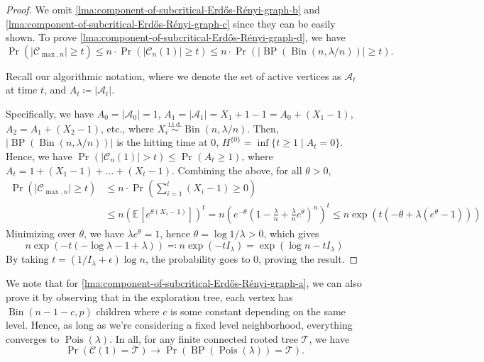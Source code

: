 \begin{proof}
	We omit \autoref{lma:component-of-subcritical-Erdős-Rényi-graph-b} and \autoref{lma:component-of-subcritical-Erdős-Rényi-graph-c} since they can be easily shown. To prove \autoref{lma:component-of-subcritical-Erdős-Rényi-graph-d}, we have
	\[
		\Pr_{}(\lvert \mathcal{C} _{\max , n} \rvert \geq t)
		\leq n \cdot \Pr_{}(\lvert \mathcal{C} _n(1) \rvert \geq t)
		\leq n \cdot \Pr_{}(\lvert \operatorname{BP}(\operatorname{Bin}(n, \lambda / n) )  \rvert \geq t).
	\]

	\begin{notation}
		Recall our algorithmic notation, where we denote the set of active vertices as \(\mathcal{A} _t\) at time \(t\), and \(A_t \coloneqq \lvert \mathcal{A} _t \rvert \).
	\end{notation}

	Specifically, we have \(A_0 = \lvert \mathcal{A} _0 \rvert = 1\), \(A_1 = \lvert \mathcal{A} _1 \rvert = X_1 + 1 - 1 = A_0 + (X_1 - 1)\), \(A_2 = A_1 + (X_2 - 1)\), etc., where \(X_i \overset{\text{i.i.d.} }{\sim } \operatorname{Bin}(n, \lambda / n) \). Then, \(\lvert \operatorname{BP}(\operatorname{Bin}(n, \lambda / n) )  \rvert \) is the hitting time at \(0\), \(H^{\{ 0 \} } = \inf \{ t \geq 1 \mid A_t = 0 \} \). Hence, we have \(\Pr_{}(\lvert \mathcal{C} _n(1) \rvert > t) \leq \Pr_{}(A_t \geq 1)\), where \(A_t = 1 + (X_1 - 1) + \dots  + (X_t - 1)\). Combining the above, for all \(\theta > 0\),
	\[
		\begin{split}
			\Pr_{}(\lvert \mathcal{C} _{\max , n} \rvert \geq t)
			 & \leq n \cdot \Pr_{}\left( \sum_{i=1}^{t} (X_i - 1) \geq 0 \right) \\
			 & \leq n \left( \mathbb{E}_{}[e^{\theta (X_1 - 1)}]  \right) ^t
			= n \left( e^{-\theta } \left( 1 - \frac{\lambda}{n} + \frac{\lambda}{n} e^{\theta } \right)^n \right) ^t
			\leq n \exp (t (-\theta + \lambda (e^\theta - 1)))
		\end{split}
	\]
	Minimizing over \(\theta \), we have \(\lambda e^\theta = 1\), hence \(\theta = \log 1 / \lambda > 0\), which gives
	\[
		n \exp (-t (-\log \lambda - 1 + \lambda ))
		\eqqcolon n \exp (- t I_\lambda )
		= \exp (\log n -t I_\lambda )
	\]
	By taking \(t = (1 / I_\lambda + \epsilon ) \log n\), the probability goes to \(0\), proving the result.
\end{proof}

\begin{note}
	We note that for \autoref{lma:component-of-subcritical-Erdős-Rényi-graph-a}, we can also prove it by observing that in the exploration tree, each vertex has \(\operatorname{Bin}(n-1-c, p) \) children where \(c\) is some constant depending on the same level. Hence, as long as we're considering a fixed level neighborhood, everything converges to \(\operatorname{Pois}(\lambda ) \). In all, for any finite connected rooted tree \(\mathcal{T} \), we have
	\[
		\Pr_{}(\mathcal{C} (1) = \mathcal{T} )  \to \Pr_{}(\operatorname{BP}(\operatorname{Pois}(\lambda ) ) = \mathcal{T} ).
	\]
\end{note}

